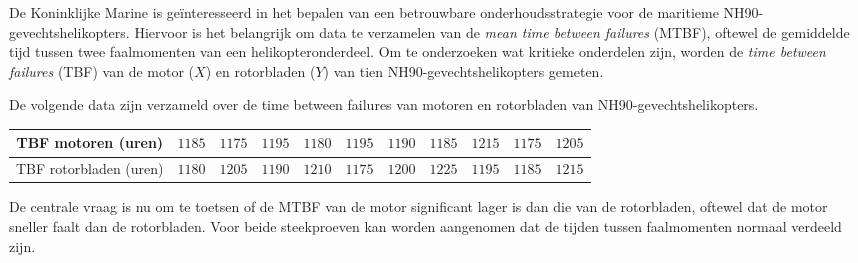 \begin{question}{28}{
    De Koninklijke Marine is geïnteresseerd in het bepalen van een betrouwbare onderhoudsstrategie voor de maritieme NH90-gevechtshelikopters.
    Hiervoor is het belangrijk om data te verzamelen van de \emph{mean time between failures} (MTBF), oftewel de gemiddelde tijd tussen twee faalmomenten van een helikopteronderdeel.
    Om te onderzoeken wat kritieke onderdelen zijn, worden de \emph{time between failures} (TBF) van de motor ($X$) en rotorbladen ($Y$) van tien NH90-gevechtshelikopters gemeten.

    De volgende data zijn verzameld over de time between failures van motoren en rotorbladen van NH90-gevechtshelikopters.
    
    \begin{center}
        \begin{tabular}{c|cccccccccc}
            \toprule
                TBF motoren (uren) & $1185$ & $1175$ & $1195$ & $1180$ & $1195$ & $1190$ & $1185$ & $1215$ & $1175$ & $1205$ \\ 
            \midrule
                TBF rotorbladen (uren) & $1180$ & $1205$ & $1190$ & $1210$ & $1175$ & $1200$ & $1225$ & $1195$ & $1185$ & $1215$ \\
            \bottomrule
        \end{tabular}
    \end{center}
    \vspace{1em}

    De centrale vraag is nu om te toetsen of de MTBF van de motor significant lager is dan die van de rotorbladen, oftewel dat de motor sneller faalt dan de rotorbladen.
    Voor beide steekproeven kan worden aangenomen dat de tijden tussen faalmomenten normaal verdeeld zijn.
}

\end{question}
